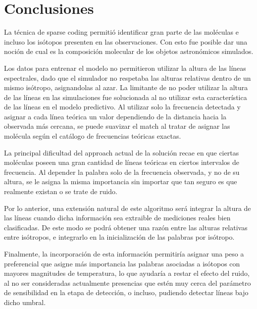 \section{Conclusiones}

La técnica de sparse coding permitió identificar gran parte de las moléculas e incluso los isótopos presenten en las observaciones. Con esto fue posible dar una noción de cual es la composición molecular de los objetos astronómicos simulados.

Los datos para entrenar el modelo no permitieron utilizar la altura de las líneas espectrales, dado que el simulador no respetaba las alturas relativas dentro de un mismo isótropo, asignandolas al azar. La limitante de no poder utilizar la altura de las líneas en las simulaciones fue solucionada al no utilizar esta característica de las líneas en el modelo predictivo. Al utilizar solo la frecuencia detectada y asignar a cada línea teórica un valor dependiendo de la distancia hacia la observada más cercana, se puede suavizar el match al tratar de asignar las molécula según el catálogo de frecuencias teóricas exactas.

La principal dificultad del approach actual de la solución recae en que ciertas moléculas poseen una gran cantidad de líneas teóricas en ciertos intervalos de frecuencia. Al depender la palabra solo de la frecuencia observada, y no de su altura, se le asigna la misma importancia sin importar que tan seguro es que realmente existan o se trate de ruido.

Por lo anterior, una extensión natural de este algoritmo será integrar la altura de las líneas cuando dicha información sea extraible de mediciones reales bien clasificadas. De este modo se podrá obtener una razón entre las alturas relativas entre isótropos, e integrarlo en la inicialización de las palabras por isótropo.

Finalmente, la incorporación de esta información permitiría asignar una peso a preferencial que asigne más importancia las palabras asociadas a isótopos con mayores magnitudes de temperatura, lo que ayudaría a restar el efecto del ruido, al no ser consideradas actualmente presencias que estén muy cerca del parámetro de sensibilidad en la etapa de detección, o incluso, pudiendo detectar líneas bajo dicho umbral.


